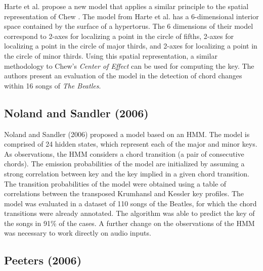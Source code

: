 Harte et al. \cite{harte2006detecting} propose a new model that applies a similar principle to the spatial representation of Chew \cite{chew2000towards}. The model from Harte et al. has a 6-dimensional interior space contained by the surface of a hypertorus. The 6 dimensions of their model correspond to 2-axes for localizing a point in the circle of fifths, 2-axes for localizing a point in the circle of major thirds, and 2-axes for localizing a point in the circle of minor thirds. Using this spatial representation, a similar methodology to Chew's \emph{Center of Effect} can be used for computing the key. The authors present an evaluation of the model in the detection of chord changes within 16 songs of \emph{The Beatles}.



\subsection{Noland and Sandler (2006)}
Noland and Sandler (2006) proposed a model based on an HMM. The model is comprised of 24 hidden states, which represent each of the major and minor keys. As observations, the HMM considers a chord transition (a pair of consecutive chords). The emission probabilities of the model are initialized by assuming a strong correlation between key and the key implied in a given chord transition. The transition probabilities of the model were obtained using a table of correlations between the transposed Krumhansl and Kessler key profiles. The model was evaluated in a dataset of 110 songs of the Beatles, for which the chord transitions were already annotated. The algorithm was able to predict the key of the songs in 91\% of the cases. A further change on the observations of the HMM was necessary to work directly on audio inputs.

\subsection{Peeters (2006)}

